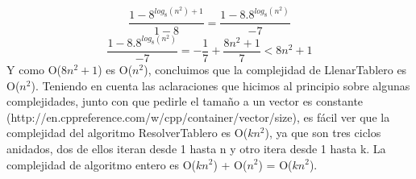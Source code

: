 \documentclass[a4paper]{article}
\begin{document}
\[
\frac{1 - 8^{log_8(n^2) + 1}}{1 - 8} = \frac{1 - 8.8^{log_8(n^2)}}{-7} 
\]
\[
\frac{1 - 8.8^{log_8(n^2)}}{-7}  = - \frac{1}{7} + \frac{8n^2 + 1}{7} < 8n^2 + 1
\]
\newline
\newline
Y como O($8n^2 + 1$) es O($n^2$), concluimos que la complejidad de LlenarTablero es O($n^2$).
\newline Teniendo en cuenta las aclaraciones que hicimos al principio sobre algunas complejidades, junto con que pedirle el tamaño a un vector es constante (http://en.cppreference.com/w/cpp/container/vector/size), es fácil ver que la complejidad del algoritmo ResolverTablero es O($kn^2$), ya que son tres ciclos anidados, dos de ellos iteran desde 1 hasta n y otro itera desde 1 hasta k.
\newline La complejidad de algoritmo entero es O($kn^2$) + O($n^2$) = O($kn^2$).
\end{document}
